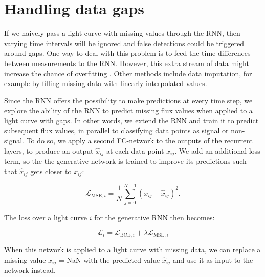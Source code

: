 
\section{Handling data gaps}
\label{sec:rnn_gen}

If we naively pass a light curve with missing values through the RNN, then varying time intervals will be ignored and false detections could be triggered around gaps. One way to deal with this problem is to feed the time differences between measurements to the RNN. However, this extra stream of data might increase the chance of overfitting . Other methods include data imputation, for example by filling missing data with linearly interpolated values.

Since the RNN offers the possibility to make predictions at every time step, we explore the ability of the RNN to predict missing flux values when applied to a light curve with gaps. In other words, we extend the RNN and train it to predict subsequent flux values, in parallel to classifying data points as signal or non-signal. To do so, we apply a second FC-network to the outputs of the recurrent layers, to produce an output $\hat{x}_{ij}$ at each data point $x_{ij}$. We add an additional loss term, so the the generative network is trained to improve its predictions such that $\hat{x}_{ij}$ gets closer to $x_{ij}$:

\begin{equation}
    \mathcal{L}_{\text{MSE},i} = \frac{1}{N}\sum^{N-1}_{j=0} (x_{ij} - \hat{x}_{ij})^2.
\end{equation}

\noindent The loss over a light curve $i$ for the generative RNN then becomes:

\begin{equation}
    \mathcal{L}_i = \mathcal{L}_{\text{BCE},i} + \lambda \mathcal{L}_{\text{MSE},i}
\end{equation}


\noindent When this network is applied to a light curve with missing data, we can replace a missing value $x_{ij}$ = NaN with the predicted value $\hat{x}_{ij}$ and use it as input to the network instead.